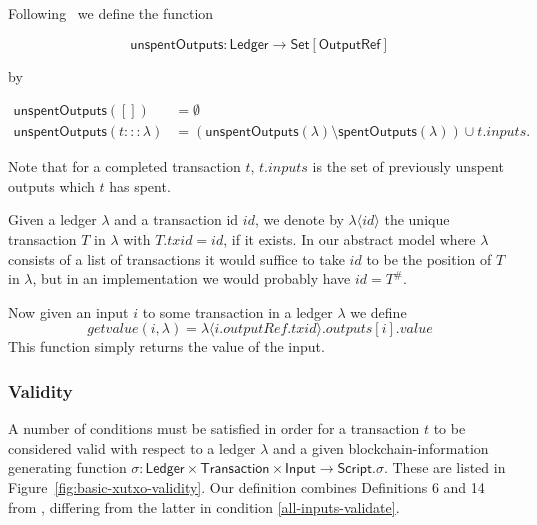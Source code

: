 \documentclass[a4paper]{article}
\theoremstyle{definition}  %
\newcommand{\mi}[1]{\ensuremath{\mathit{#1}}}
\newcommand{\txid}{\mi{txid}}
\newcommand{\inputs}{\mi{inputs}}
\newcommand{\outputs}{\mi{outputs}}
\newcommand{\outputref}{\mi{outputRef}}
\newcommand{\id}{\mi{id}}
\newcommand{\getvalue}{\mi{getvalue}}
\newcommand{\msf}[1]{\ensuremath{\mathsf{#1}}}
\newcommand{\spent}{\msf{spentOutputs}}
\newcommand{\unspent}{\msf{unspentOutputs}}
\begin{document}
\noindent Following~\cite{Zahnentferner18-UTxO} we define the function

\[
  \unspent : \mathsf{Ledger} \rightarrow \mathsf{Set[OutputRef]}
\]

\noindent by

\begin{align*}
   \unspent([]) &=\emptyset \\
   \unspent(t:::\lambda) &= (\unspent(\lambda) \setminus \spent(\lambda)) \cup t.\inputs.
\end{align*}

\noindent Note that for a completed transaction $t$, $t.\inputs$ is
the set of previously unspent outputs which $t$ has spent.

\vspace{7pt}
\noindent Given a ledger $\lambda$ and a transaction id $\id$, we
denote by $\lambda\langle\id\rangle$ the unique transaction $T$ in
$\lambda$ with $T.\txid = \id$, if it exists. In our abstract model
where $\lambda$ consists of a list of transactions it would suffice to
take $id$ to be the position of $T$ in $\lambda$, but in an
implementation we would probably have $id = T^{\#}$.

Now given an input $i$ to some transaction in a ledger $\lambda$
we define 
$$
\getvalue(i,\lambda) = \lambda\langle i.\outputref.\txid \rangle.\outputs[i].value
$$
This function simply returns the value of the input.

\subsubsection{Validity}
A number of conditions must be satisfied in order for a transaction
$t$ to be considered valid with respect to a ledger $\lambda$ and a
given blockchain-information generating function $\sigma :
\mathsf{Ledger} \times \mathsf{Transaction} \times \mathsf{Input}
\rightarrow \mathsf{Script}$.$\sigma$.  These are listed in
Figure~\ref{fig:basic-xutxo-validity}.  Our definition combines
Definitions 6 and 14 from \cite{Zahnentferner18-UTxO}, differing from
the latter in condition \ref{all-inputs-validate}.
\end{document}

